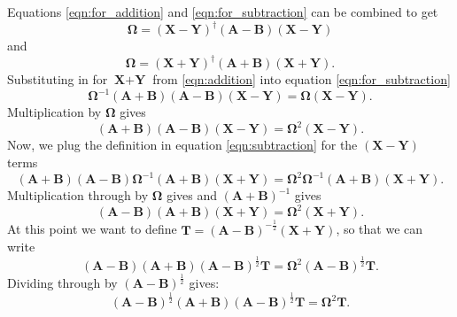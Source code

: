 \documentclass[12pt]{caltech_thesis}
\begin{document}
Equations \ref{eqn:for_addition} and \ref{eqn:for_subtraction} can be combined to get
\begin{equation}
    \boldsymbol{\Omega } = (\textbf{X}-\textbf{Y})^{\dag} (\textbf{A}-\textbf{B})(\textbf{X}-\textbf{Y})
\end{equation}
and
\begin{equation}
    \boldsymbol{\Omega } = (\textbf{X}+\textbf{Y})^{\dag} (\textbf{A}+\textbf{B})(\textbf{X}+\textbf{Y}).
\end{equation}
Substituting in for $\textbf{X}+\textbf{Y}$ from \ref{eqn:addition} into equation \ref{eqn:for_subtraction}
\begin{equation}
    \boldsymbol{\Omega }^{-1}(\textbf{A}+\textbf{B})(\textbf{A}-\textbf{B})(\textbf{X}-\textbf{Y}) = \boldsymbol{\Omega } (\textbf{X}-\textbf{Y}).
\end{equation}
Multiplication by $\boldsymbol{\Omega }$ gives
\begin{equation}
    (\textbf{A}+\textbf{B})(\textbf{A}-\textbf{B})(\textbf{X}-\textbf{Y}) = \boldsymbol{\Omega }^2 (\textbf{X}-\textbf{Y}).
\end{equation}
Now, we plug the definition in equation \ref{eqn:subtraction} for the $(\textbf{X}-\textbf{Y})$ terms
\begin{equation}
    (\textbf{A}+\textbf{B})(\textbf{A}-\textbf{B})\boldsymbol{\Omega }^{-1}(\textbf{A}+\textbf{B})(\textbf{X}+\textbf{Y}) = \boldsymbol{\Omega }^2 \boldsymbol{\Omega }^{-1}(\textbf{A}+\textbf{B})(\textbf{X}+\textbf{Y}).
\end{equation}
Multiplication through by $\boldsymbol{\Omega }$ gives and $(\textbf{A}+\textbf{B})^{-1}$ gives
\begin{equation}
    (\textbf{A}-\textbf{B})(\textbf{A}+\textbf{B})(\textbf{X}+\textbf{Y}) = \boldsymbol{\Omega }^{2} (\textbf{X}+\textbf{Y}).
\end{equation}
At this point we want to define $\textbf{T}=(\textbf{A}-\textbf{B})^{-\frac{1}{2}}(\textbf{X}+\textbf{Y})$, so that we can write
\begin{equation}
    (\textbf{A}-\textbf{B})(\textbf{A}+\textbf{B})(\textbf{A}-\textbf{B})^{\frac{1}{2}}\textbf{T} = \boldsymbol{\Omega }^{2} (\textbf{A}-\textbf{B})^{\frac{1}{2}}\textbf{T}.
\end{equation}
Dividing through by $(\textbf{A}-\textbf{B})^{\frac{1}{2}}$ gives:
\begin{equation}
    (\textbf{A}-\textbf{B})^{\frac{1}{2}}(\textbf{A}+\textbf{B})(\textbf{A}-\textbf{B})^{\frac{1}{2}}\textbf{T} = \boldsymbol{\Omega }^{2} \textbf{T}.
\label{eqn:final}
\end{equation}
\end{document}
